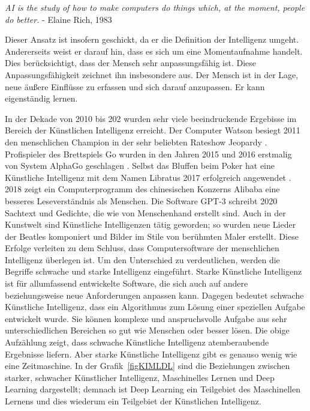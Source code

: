 \bigskip

\textsl{\glqq AI is the study of how to make computers do things which, at the moment, people do better.\grqq{}} - Elaine Rich, 1983 
	
\bigskip

Dieser Ansatz ist insofern geschickt, da er die Definition der Intelligenz umgeht. Andererseits weist er darauf hin, dass es sich um eine Momentaufnahme handelt. Dies berücksichtigt, dass der Mensch sehr anpassungsfähig ist. Diese Anpassungsfähigkeit zeichnet ihn insbesondere aus. Der Mensch ist in der Lage, neue äußere Einflüsse zu erfassen und sich darauf anzupassen. Er kann eigenständig lernen.

\bigskip

In der Dekade von 2010 bis 202 wurden sehr viele beeindruckende Ergebisse im Bereich der Künstlichen Intelligenz erreicht. Der Computer  Watson besiegt 2011 den menschlichen Champion in der sehr beliebten Rateshow \glqq Jeopardy\grqq{} \cite{Ferrucci:2012}. Profispieler des Brettspiels Go wurden in den Jahren 2015 und 2016 erstmalig von  System AlphaGo geschlagen \Cite{Wang:2016}. Selbst das Bluffen beim Poker hat eine Künstliche Intelligenz mit dem Namen Libratus 2017 erfolgreich angewendet \cite{Brown:2018}. 2018 zeigt ein Computerprogramm des chinesischen Konzerns Alibaba eine besseres Leseverständnis als Menschen. Die Software GPT-3 schreibt 2020  Sachtext und Gedichte, die wie von Menschenhand erstellt sind. Auch in der Kunstwelt sind Künstliche Intelligenzen tätig geworden; so wurden neue Lieder der Beatles komponiert und Bilder im Stile von berühmten Maler erstellt. Diese Erfolge verleiten zu dem Schluss, dass Computersoftware der menschlichen Intelligenz überlegen ist. Um den Unterschied zu verdeutlichen, werden die Begriffe schwache und starke Intelligenz eingeführt. Starke Künstliche Intelligenz ist für allumfassend entwickelte Software, die sich auch auf andere beziehungsweise neue Anforderungen anpassen kann. Dagegen bedeutet schwache Künstliche Intelligenz, dass ein Algorithmus zum Lösung einer speziellen Aufgabe entwickelt wurde. Sie können komplexe und anspruchsvolle Aufgabe aus sehr unterschiedlichen Bereichen so gut  wie Menschen  oder besser lösen. Die obige Aufzählung zeigt, dass schwache Künstliche Intelligenz atemberaubende Ergebnisse liefern. Aber starke Künstliche Intelligenz gibt es genauso wenig wie eine Zeitmaschine.
In der Grafik~\ref{figKIMLDL} sind die Beziehungen zwischen starker, schwacher Künstlicher Intelligenz, Maschinelles Lernen und Deep Learning dargestellt; demnach ist Deep Learning ein Teilgebiet des Maschinellen Lernens und dies wiederum ein Teilgebiet der Künstlichen Intelligenz.

